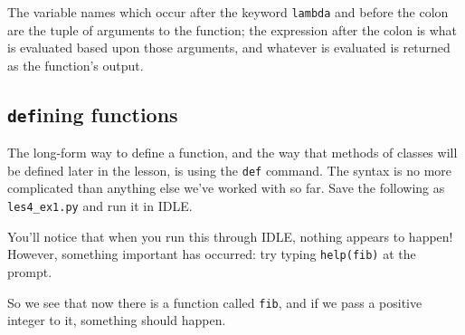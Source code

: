 \documentclass[m3380-lec-main.tex]{subfiles}
\begin{document}
\smallskip\noindent
The variable names which occur after the keyword \verb|lambda| and before the colon are the tuple of arguments to the function; the expression after the colon is what is evaluated based upon those arguments, and whatever is evaluated is returned as the function's output.

\subsection{\texttt{def}ining functions}
The long-form way to define a function, and the way that methods of classes will be defined later in the lesson, is using the \verb|def| command. The syntax is no more complicated than anything else we've worked with so far. Save the following as \verb|les4_ex1.py| and run it in IDLE.

\smallskip\noindent
You'll notice that when you run this through IDLE, nothing appears to happen! However, something important has occurred: try typing \verb|help(fib)| at the prompt.

\smallskip\noindent 
So we see that now there is a function called \verb|fib|, and if we pass a positive integer to it, something should happen.
\end{document}
